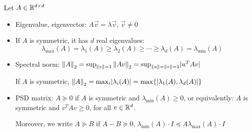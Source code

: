 \begin{definition} Let \(A \in \mathbb{R}^{d \times d}\)
    \begin{itemize}
        \item Eigenvalue, eigenvector: \(A \vec{v} = \lambda \vec{v}\), \(\vec{v} \neq 0\)
        \item If \(A\) is symmetric, it has \(d\) real eigenvalues: 
        \[
            \lambda_{\text{max}} (A) = \lambda_1 (A) \geq \lambda_2 (A) \geq \cdots \geq \lambda_d(A)
            = \lambda_{\text{min}} (A)  
        \]
        \item Spectral norm: \(\norm{A}_2 = \sup_{\norm{v} = 1} \norm{Av}_2 = 
        \sup_{\norm{u}=\norm{v}=1} \lvert u^T A v \rvert\)
        
        If \(A\) is symmetric, \(\norm{A}_2 = \max_i \lvert \lambda_i (A) \rvert = \max \{
            \lvert \lambda_1 (A), \lambda_d (A) \rvert\}\)

        \item PSD matrix: \(A \succeq 0\) if \(A\) is symmetric and \(\lambda_{\text{min}} (A)\geq 0\), 
        or equivalently: \(A\) is symmetric and \(v^T A v \geq 0\), for all \(v \in \mathbb{R}^d\). 
        
        Moreover, we write \(A \succeq B\) if \(A - B \succeq 0\), \(\lambda_{\text{min}}(A) \cdot I \preceq A 
        \lambda_{\text{max}}(A) \cdot I\)
    \end{itemize}
\end{definition}


